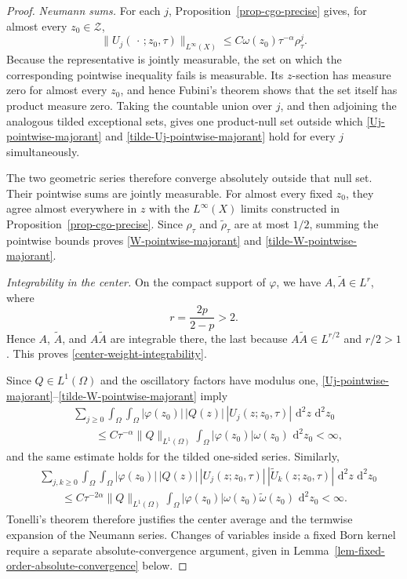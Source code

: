 \documentclass[a4paper,11pt]{article}
\newcommand{\dd}{\,\text{d}}
\theoremstyle{plain}
\theoremstyle{definition}
\theoremstyle{remark}
\begin{document}
\begin{proof}
\par\smallskip\noindent\emph{Neumann sums.}
For each $j$, Proposition~\ref{prop-cgo-precise} gives, for almost every
$z_0\in\mathcal Z$,
\begin{equation*}
        \|U_j(\,\cdot\,;z_0,\tau)\|_{L^\infty(X)}
        \leq C\omega(z_0)\tau^{-\alpha}\rho_\tau^j.
\end{equation*}
Because the representative is jointly measurable, the set on which the
corresponding pointwise inequality fails is measurable.  Its $z$-section has
measure zero for almost every $z_0$, and hence Fubini's theorem shows that the
set itself has product measure zero.  Taking the countable union over $j$, and
then adjoining the analogous tilded exceptional sets, gives one product-null
set outside which \eqref{Uj-pointwise-majorant} and
\eqref{tilde-Uj-pointwise-majorant} hold for every $j$ simultaneously.

The two geometric series therefore converge absolutely outside that null set.
Their pointwise sums are jointly measurable.  For almost every fixed $z_0$,
they agree almost everywhere in $z$ with the $L^\infty(X)$ limits constructed
in Proposition~\ref{prop-cgo-precise}.  Since $\rho_\tau$ and
$\widetilde\rho_\tau$ are at most $1/2$, summing the pointwise bounds proves
\eqref{W-pointwise-majorant} and \eqref{tilde-W-pointwise-majorant}.

\par\smallskip\noindent\emph{Integrability in the center.}
On the compact support of $\varphi$, we have $A,\widetilde A\in L^r$, where
\begin{equation*}
        r=\frac{2p}{2-p}>2.
\end{equation*}
Hence $A$, $\widetilde A$, and $A\widetilde A$ are integrable there, the last because $A\widetilde A\in L^{r/2}$ and $r/2>1$.  This proves
\eqref{center-weight-integrability}.

Since $Q\in L^1(\Omega)$ and the oscillatory factors have modulus one,
\eqref{Uj-pointwise-majorant}--\eqref{tilde-W-pointwise-majorant} imply
\begin{align*}
 &\sum_{j\geq0}\int_\Omega\int_\Omega
 |\varphi(z_0)|\,|Q(z)|\,|U_j(z;z_0,\tau)|\,\dd^2z\,\dd^2z_0\\
 &\qquad\leq
 C\tau^{-\alpha}\|Q\|_{L^1(\Omega)}
 \int_\Omega |\varphi(z_0)|\omega(z_0)\,\dd^2z_0<\infty,
\end{align*}
and the same estimate holds for the tilded one-sided series.  Similarly,
\begin{align*}
 &\sum_{j,k\geq0}\int_\Omega\int_\Omega
 |\varphi(z_0)|\,|Q(z)|\,
 |U_j(z;z_0,\tau)|\,|\widetilde U_k(z;z_0,\tau)|
 \,\dd^2z\,\dd^2z_0\\
 &\qquad\leq
 C\tau^{-2\alpha}\|Q\|_{L^1(\Omega)}
 \int_\Omega |\varphi(z_0)|\omega(z_0)\widetilde\omega(z_0)
 \,\dd^2z_0<\infty.
\end{align*}
Tonelli's theorem therefore justifies the center average and the termwise expansion of the Neumann series.  Changes of variables inside a fixed Born kernel require a separate absolute-convergence argument, given in Lemma~\ref{lem-fixed-order-absolute-convergence} below.
\end{proof}
\end{document}
